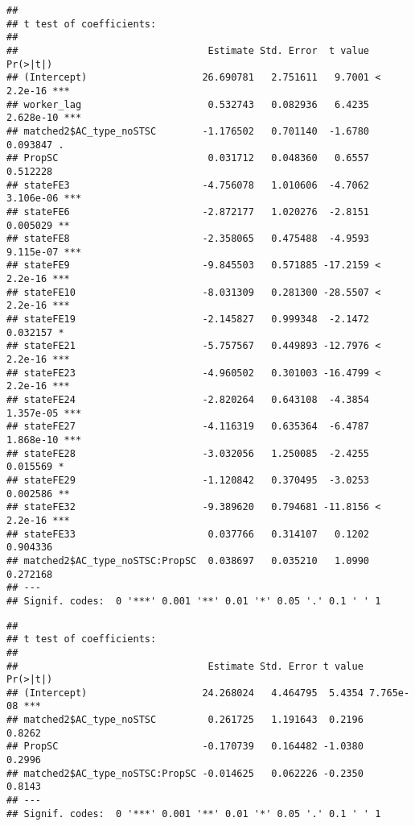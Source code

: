 \documentclass[
]{article}
\newenvironment{Shaded}{\begin{snugshade}}{\end{snugshade}}
\newcommand{\AttributeTok}[1]{\textcolor[rgb]{0.77,0.63,0.00}{#1}}
\newcommand{\FunctionTok}[1]{\textcolor[rgb]{0.00,0.00,0.00}{#1}}
\newcommand{\NormalTok}[1]{#1}
\newcommand{\OtherTok}[1]{\textcolor[rgb]{0.56,0.35,0.01}{#1}}
\newcommand{\SpecialCharTok}[1]{\textcolor[rgb]{0.00,0.00,0.00}{#1}}
\newcommand{\StringTok}[1]{\textcolor[rgb]{0.31,0.60,0.02}{#1}}
\begin{document}
\begin{verbatim}
## 
## t test of coefficients:
## 
##                                 Estimate Std. Error  t value  Pr(>|t|)    
## (Intercept)                    26.690781   2.751611   9.7001 < 2.2e-16 ***
## worker_lag                      0.532743   0.082936   6.4235 2.628e-10 ***
## matched2$AC_type_noSTSC        -1.176502   0.701140  -1.6780  0.093847 .  
## PropSC                          0.031712   0.048360   0.6557  0.512228    
## stateFE3                       -4.756078   1.010606  -4.7062 3.106e-06 ***
## stateFE6                       -2.872177   1.020276  -2.8151  0.005029 ** 
## stateFE8                       -2.358065   0.475488  -4.9593 9.115e-07 ***
## stateFE9                       -9.845503   0.571885 -17.2159 < 2.2e-16 ***
## stateFE10                      -8.031309   0.281300 -28.5507 < 2.2e-16 ***
## stateFE19                      -2.145827   0.999348  -2.1472  0.032157 *  
## stateFE21                      -5.757567   0.449893 -12.7976 < 2.2e-16 ***
## stateFE23                      -4.960502   0.301003 -16.4799 < 2.2e-16 ***
## stateFE24                      -2.820264   0.643108  -4.3854 1.357e-05 ***
## stateFE27                      -4.116319   0.635364  -6.4787 1.868e-10 ***
## stateFE28                      -3.032056   1.250085  -2.4255  0.015569 *  
## stateFE29                      -1.120842   0.370495  -3.0253  0.002586 ** 
## stateFE32                      -9.389620   0.794681 -11.8156 < 2.2e-16 ***
## stateFE33                       0.037766   0.314107   0.1202  0.904336    
## matched2$AC_type_noSTSC:PropSC  0.038697   0.035210   1.0990  0.272168    
## ---
## Signif. codes:  0 '***' 0.001 '**' 0.01 '*' 0.05 '.' 0.1 ' ' 1
\end{verbatim}

\begin{Shaded}
\end{Shaded}

\begin{verbatim}
## 
## t test of coefficients:
## 
##                                 Estimate Std. Error t value  Pr(>|t|)    
## (Intercept)                    24.268024   4.464795  5.4354 7.765e-08 ***
## matched2$AC_type_noSTSC         0.261725   1.191643  0.2196    0.8262    
## PropSC                         -0.170739   0.164482 -1.0380    0.2996    
## matched2$AC_type_noSTSC:PropSC -0.014625   0.062226 -0.2350    0.8143    
## ---
## Signif. codes:  0 '***' 0.001 '**' 0.01 '*' 0.05 '.' 0.1 ' ' 1
\end{verbatim}
\end{document}
